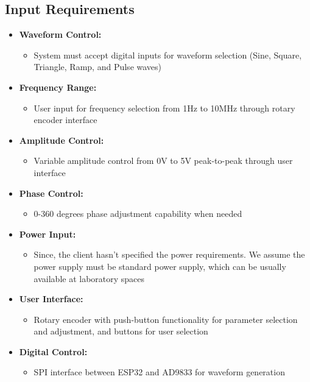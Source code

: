 \documentclass[a4paper,12pt]{article}
\begin{document}
\subsection{Input Requirements}
\begin{itemize}
    \item \textbf{Waveform Control:}
    \begin{itemize}
        \item System must accept digital inputs for waveform selection (Sine, Square, Triangle, Ramp, and Pulse waves)
    \end{itemize}
    \item \textbf{Frequency Range:}
    \begin{itemize}
        \item User input for frequency selection from 1Hz to 10MHz through rotary encoder interface
    \end{itemize}
    \item \textbf{Amplitude Control:}
    \begin{itemize}
        \item Variable amplitude control from 0V to 5V peak-to-peak through user interface
    \end{itemize}
    \item \textbf{Phase Control:}
    \begin{itemize}
        \item 0-360 degrees phase adjustment capability when needed
    \end{itemize}
    \item \textbf{Power Input:}
    \begin{itemize}
        \item Since, the client hasn’t specified the power requirements. We assume the power supply must be standard power supply, which can be usually available at laboratory spaces
    \end{itemize}
    \item \textbf{User Interface:}
    \begin{itemize}
        \item Rotary encoder with push-button functionality for parameter selection and adjustment, and buttons for user selection
    \end{itemize}
    \item \textbf{Digital Control:}
    \begin{itemize}
        \item SPI interface between ESP32 and AD9833 for waveform generation
    \end{itemize}
\end{itemize}
\end{document}

